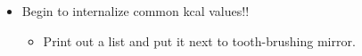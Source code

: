 \documentclass[../notes.tex]{subfiles}
\begin{document}
\begin{itemize}
\begin{table}[h!]
        \label{tab:energyRate}
    \end{table}
    \begin{itemize}
        \item Let's define $\Delta G^\ddagger$ (in \si[per-mode=symbol]{\kilo\calorie\per\mole} at \SI{298}{\kelvin}), the rate constant $k$ (in \si{\per\second}), and the half-life $\tau_{1/2}$ (in \si{\second}).
        \item Example of a  process: Ethane bond rotation.
    \end{itemize}
    \item Begin to internalize common kcal values!!
    \begin{itemize}
        \item Print out a list and put it next to tooth-brushing mirror.
    \end{itemize}
\end{itemize}
\end{document}
